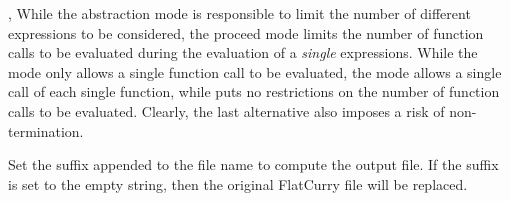 \begin{description}
\item{, }
While the abstraction mode is responsible to limit the number of
different expressions to be considered, the proceed mode
limits the number of function calls to be evaluated during
the evaluation of a \emph{single} expressions.
While the mode  only allows a single function call
to be evaluated, the mode  allows a single call
of each single function, while  puts no restrictions
on the number of function calls to be evaluated.
Clearly, the last alternative also imposes a risk of non-termination.

\item{}
Set the suffix appended to the file name to compute the output file.
If the suffix is set to the empty string, then the original FlatCurry
file will be replaced.
\end{description}
